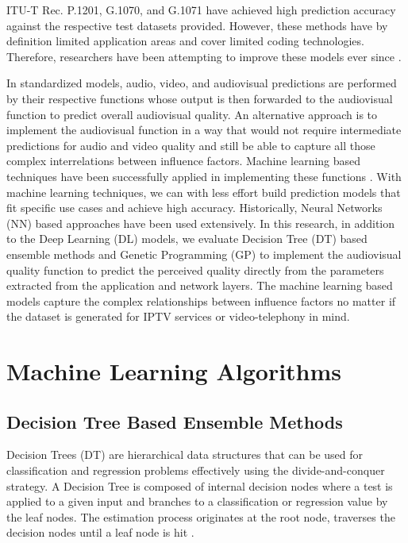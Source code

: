 \documentclass[journal]{IEEEtran}
\begin{document}
ITU-T Rec. P.1201, G.1070, and  G.1071 have achieved high prediction accuracy against the respective test datasets provided. However, these methods have by definition limited application areas and cover limited coding technologies. Therefore, researchers have been attempting to improve these models ever since \cite{garcia2014parametric} \cite{belmudez2015audiovisual}.

In standardized models,  audio, video, and audiovisual predictions are performed by their respective functions whose output is then forwarded to the audiovisual function to predict overall audiovisual quality. An alternative approach is to implement the audiovisual function in a way that would not require intermediate predictions for audio and video quality and still be able to capture all those complex interrelations between influence factors. Machine learning based techniques have been successfully applied in implementing these functions \cite{maki2013reduced} \cite{gastaldo2013supporting}. With machine learning techniques, we can with less effort build prediction models that fit specific use cases and achieve high accuracy. Historically, Neural Networks (NN) based approaches have been used extensively. 
In this research, in addition to the Deep Learning (DL) models, we evaluate Decision Tree (DT) based ensemble methods and Genetic Programming (GP) to implement the audiovisual quality function to predict the perceived quality directly from the parameters extracted from the application and network layers. The machine learning based models capture the complex relationships between influence factors no matter if the dataset is generated for IPTV services or video-telephony in mind.

\vspace{-0.3cm}
\section{Machine Learning Algorithms}
\label{sec:ml}

\subsection{Decision Tree Based Ensemble Methods}
Decision Trees (DT) are hierarchical data structures that can be used for classification and regression problems effectively using the divide-and-conquer strategy. A Decision Tree is composed of internal decision nodes where a test is applied to a given input and branches to a classification or regression value by the leaf nodes. The estimation process originates at the root node, traverses the decision nodes until a leaf node is hit \cite{alpaydin2014introduction} \cite{mushtaq2012empirical}.
\end{document}
